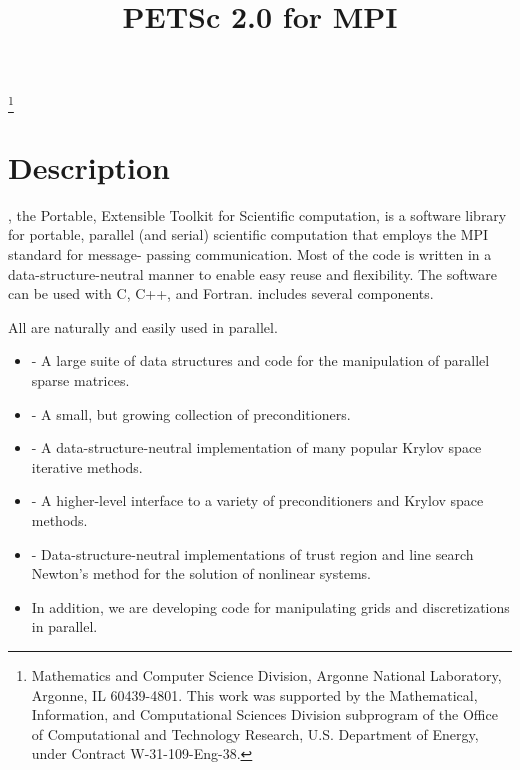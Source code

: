 \pagestyle{empty}

\pagestyle{empty}
\title{PETSc 2.0 for MPI}
\thanks{Mathematics and Computer Science Division,
Argonne National Laboratory,
Argonne, IL 60439-4801.
This work was supported by the Mathematical,
        Information, and Computational Sciences Division subprogram of
        the Office of Computational and Technology Research,
        U.S. Department of Energy, under Contract W-31-109-Eng-38.}

\date{}
\maketitle

\section*{Description}

, the Portable, Extensible Toolkit for Scientific computation,
is a software library for portable, parallel (and serial)
scientific computation that employs the MPI standard for message-
passing communication.  Most of the code is written in a
data-structure-neutral manner to enable easy reuse and flexibility.
The  software can be used with C, C++, and Fortran.
 includes several components. 

All  are naturally and easily used in parallel.

\vspace{-.6cm}

\begin{itemize}
\item {} - A large suite of data structures and code
      for the manipulation of parallel sparse matrices.
\item {} - A small, but growing collection of preconditioners.
\item {} - A data-structure-neutral implementation of
      many popular Krylov space iterative methods.
\item {} - A higher-level interface to a variety
      of preconditioners and Krylov space methods.
\item {} - Data-structure-neutral 
      implementations of trust region and line search Newton's 
      method for the solution of nonlinear systems. 
\item In addition, we are developing code for manipulating grids
      and discretizations in parallel.
\end{itemize}

